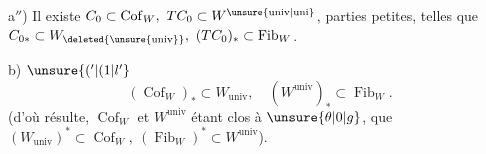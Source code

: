 a$''$) Il existe $C_{0}\subset\operatorname{Cof}_{W},\ TC_{0}\subset W^{\unsure{\mathrm{univ}|\mathrm{uni}}}$, parties petites, telles que $C_{0*}\subset W_{\deleted{\unsure{\mathrm{univ}}}},\ (TC_{0})_{*}\subset\operatorname{Fib}_{W}$.

b)  \(\unsure{('|(1|l'}\)
\[
 (\operatorname{Cof}_{W})_{*}\subset W_{\mathrm{univ}},\quad(W^{\mathrm{univ}})_{*}\subset\operatorname{Fib}_{W}.
\]
(d'où résulte, $\operatorname{Cof}_{W}$ et $W^{\mathrm{univ}}$ étant clos à $\unsure{\theta|0|g}$, que $(W_{\mathrm{univ}})^{*}\subset\operatorname{Cof}_{W},\ (\operatorname{Fib}_{W})^{*}\subset W^{\mathrm{univ}}$).
